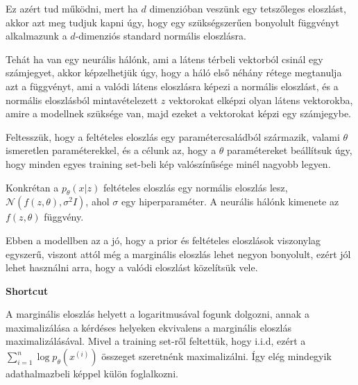 \documentclass[12pt]{amsart}
\begin{document}
\vspace{5pt}

Ez azért tud működni, mert ha $d$ dimenzióban veszünk egy
tetszőleges eloszlást, akkor azt meg tudjuk kapni úgy, hogy
egy szükségszerűen bonyolult függvényt alkalmazunk a
$d$-dimenziós standard normális eloszlásra.

\vspace{5pt}

Tehát ha van egy neurális hálónk, ami a látens térbeli
vektorból csinál egy számjegyet, akkor képzelhetjük úgy,
hogy a háló első néhány rétege megtanulja azt a függvényt,
ami a valódi látens eloszlásra képezi a normális eloszlást,
és a normális eloszlásból mintavételezett $z$ vektorokat
elképzi olyan látens vektorokba, amire a modellnek szüksége
van, majd ezeket a vektorokat képzi egy számjegybe. 

\vspace{5pt}

Feltesszük, hogy a feltételes eloszlás egy
paramétercsaládból származik, valami $\theta$ ismeretlen
paraméterekkel, és a célunk az, hogy a $\theta$
paramétereket beállítsuk úgy, hogy minden egyes training
set-beli kép valószínűsége minél nagyobb legyen. 

\vspace{5pt}

Konkrétan a $p_\theta(x| z)$ feltételes eloszlás egy
normális eloszlás lesz,
$\mathcal{N}(f(z, \theta), \sigma^2 I)$, ahol $\sigma$ egy
hiperparaméter. A neurális hálónk kimenete az $f(z, \theta)$
függvény. 

\vspace{5pt}

Ebben a modellben az a jó, hogy a prior és feltételes
eloszlások viszonylag egyszerű, viszont attól még a
marginális eloszlás lehet negyon bonyolult, ezért jól lehet
használni arra, hogy a valódi eloszlást közelítsük vele.

\vspace{10pt}

\textbf{Shortcut}

\vspace{10pt}

A marginális eloszlás helyett a logaritmusával fogunk
dolgozni, annak a maximalizálása a kérdéses helyeken
ekvivalens a marginális eloszlás maximalizálásával. Mivel a
training set-ről feltettük, hogy i.i.d, ezért a
$\sum_{i=1}^n \log p_{\theta}(x^{(i)})$ összeget szeretnénk
maximalizálni. Így elég mindegyik adathalmazbeli képpel
külön foglalkozni.
\end{document}
